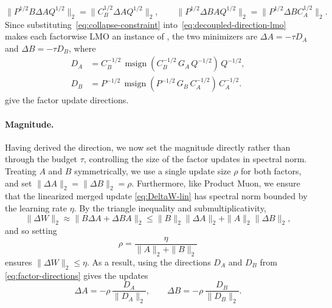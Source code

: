\documentclass[11pt]{article}
\DeclareMathOperator{\msign}{msign}          %
\newcommand{\norm}[1]{\| #1\|}
\theoremstyle{plain}
\theoremstyle{definition}
\theoremstyle{remark}
\theoremstyle{definition}
\begin{document}
\begin{equation} \label{eq:collapse-constraint}
\norm{P^{1/2}B\Delta A Q^{1/2}}_2=\norm{C_B^{1/2}\Delta A Q^{1/2}}_2,
\qquad
\norm{P^{1/2}\Delta B A Q^{1/2}}_2=\norm{P^{1/2}\Delta B C_A^{1/2}}_2 .
\end{equation}
Since substituting~\eqref{eq:collapse-constraint} into~\eqref{eq:decoupled-direction-lmo} makes each factorwise LMO an instance of , the two minimizers are $\Delta A = -\tau D_A$ and $\Delta B = -\tau D_B$, where
\begin{equation}
  \begin{aligned}
  D_A &=
  C_B^{-1/2}\,
  \msign\!\left(C_B^{-1/2}\,G_A\,Q^{-1/2}\right)
  \,Q^{-1/2},\\
  D_B &=
  P^{-1/2}\,
  \msign\!\left(P^{-1/2}\,G_B\,C_A^{-1/2}\right)
  \,C_A^{-1/2}.
  \end{aligned}
  \label{eq:factor-directions}
\end{equation}
give the factor update directions.

\paragraph{Magnitude.}
Having derived the direction, we now set the magnitude directly rather than through the budget $\tau$, controlling the size of the factor updates in spectral norm. Treating $A$ and $B$ symmetrically, we use a single update size $\rho$ for both factors, and set $\norm{\Delta A}_2=\norm{\Delta B}_2=\rho$. Furthermore, like Product Muon, we ensure that the linearized merged update \eqref{eq:DeltaW-lin} has spectral norm bounded by the learning rate $\eta$. By the triangle inequality and submultiplicativity,
\begin{equation}
\norm{\Delta W}_2
\approx
\norm{B\Delta A+\Delta B A}_2
\le
\norm{B}_2\norm{\Delta A}_2
+
\norm{A}_2\norm{\Delta B}_2,
\label{eq:ours-prodcap}
\end{equation}
and so setting
\begin{equation}
\rho = \frac{\eta}{\norm{A}_2+\norm{B}_2}
\label{eq:ours-rho}
\end{equation}
ensures $\norm{\Delta W}_2\leq \eta$. As a result, using the directions $D_A$ and $D_B$ from \eqref{eq:factor-directions} gives the updates
\begin{equation}
\Delta A = -\rho\,\frac{D_A}{\norm{D_A}_2},
\qquad
\Delta B = -\rho\,\frac{D_B}{\norm{D_B}_2}.
\label{eq:polora-update}
\end{equation}
\end{document}
